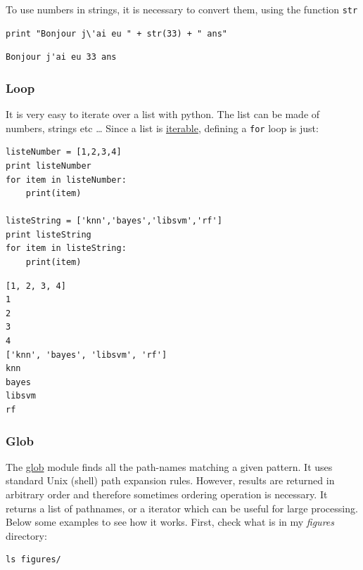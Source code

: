 \documentclass[a4paper,11pt,DIV=18]{scrartcl}
\begin{document}
To use numbers in strings, it is necessary to convert them, using the function \texttt{str}

\begin{verbatim}
print "Bonjour j\'ai eu " + str(33) + " ans"
\end{verbatim}

\begin{verbatim}
Bonjour j'ai eu 33 ans
\end{verbatim}

\subsubsection{Loop}
\label{sec:org131efa6}
It is very  easy to iterate over  a list with python. The  list can be
made of numbers, strings etc \ldots{}  Since a list is \href{https://docs.python.org/2/glossary.html}{iterable}, defining a
\texttt{for} loop is just:

\begin{verbatim}
listeNumber = [1,2,3,4]
print listeNumber
for item in listeNumber:
    print(item)

listeString = ['knn','bayes','libsvm','rf']
print listeString
for item in listeString:
    print(item)
\end{verbatim}

\begin{verbatim}
[1, 2, 3, 4]
1
2
3
4
['knn', 'bayes', 'libsvm', 'rf']
knn
bayes
libsvm
rf
\end{verbatim}

\subsubsection{Glob}
\label{sec:orgb0c5c25}
The \href{https://docs.python.org/2/library/glob.html}{glob} module finds all the  path-names matching a given pattern. It
uses standard Unix (shell) path  expansion rules. However, results are
returned in arbitrary order and therefore sometimes ordering operation
is necessary. It returns a list  of pathnames, or a iterator which can
be useful  for large  processing. Below  some examples  to see  how it
works. First, check what is in my \emph{figures} directory:

\begin{verbatim}
ls figures/
\end{verbatim}
\end{document}
